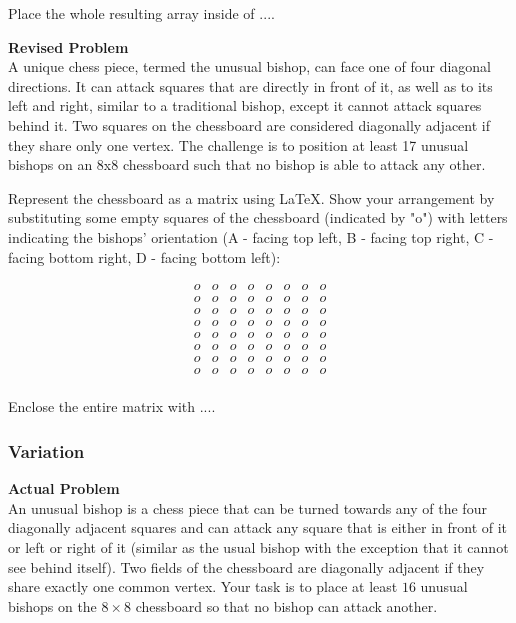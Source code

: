 Place the whole resulting array inside of $\boxed{...}$.


\textbf{Revised Problem}\\
A unique chess piece, termed the unusual bishop, can face one of four diagonal directions. It can attack squares that are directly in front of it, as well as to its left and right, similar to a traditional bishop, except it cannot attack squares behind it. Two squares on the chessboard are considered diagonally adjacent if they share only one vertex. The challenge is to position at least 17 unusual bishops on an 8x8 chessboard such that no bishop is able to attack any other.

Represent the chessboard as a matrix using LaTeX. Show your arrangement by substituting some empty squares of the chessboard (indicated by "o") with letters indicating the bishops' orientation (A - facing top left, B - facing top right, C - facing bottom right, D - facing bottom left):

$$\begin{array}{cccccccc}
o & o & o & o & o & o & o & o \\
o & o & o & o & o & o & o & o \\
o & o & o & o & o & o & o & o \\
o & o & o & o & o & o & o & o \\
o & o & o & o & o & o & o & o \\
o & o & o & o & o & o & o & o \\
o & o & o & o & o & o & o & o \\
o & o & o & o & o & o & o & o \\
\end{array}$$

Enclose the entire matrix with $\boxed{...}$.

\subsubsection{Variation}
\textbf{Actual Problem}\\
An unusual bishop is a chess piece that can be turned towards any of the four diagonally adjacent squares and can attack any square that is either in front of it or left or right of it (similar as the usual bishop with the exception that it cannot see behind itself).
Two fields of the chessboard are diagonally adjacent if they share exactly one common vertex. Your task is to place at least $16$ unusual bishops on the $8 \times 8$ chessboard so that no bishop can attack another.

